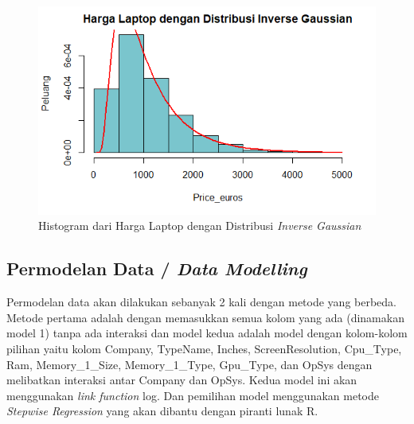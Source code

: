 \documentclass[12pt]{article}
\begin{document}
 \begin{figure}[h!]
    \centering
    \includegraphics[scale = 0.5]{distinv.png}
    \caption{Histogram dari Harga Laptop dengan Distribusi \textit{Inverse Gaussian}}
    \label{fig:ashis}
\end{figure}  

\subsection{Permodelan Data / \textit{Data Modelling}}  
Permodelan data akan dilakukan sebanyak 2 kali dengan metode yang berbeda. Metode pertama adalah dengan memasukkan semua kolom yang ada (dinamakan model 1) tanpa ada interaksi dan model kedua adalah model dengan kolom-kolom pilihan yaitu kolom Company, TypeName, Inches, ScreenResolution, Cpu\_Type, Ram, Memory\_1\_Size, Memory\_1\_Type, Gpu\_Type, dan OpSys dengan melibatkan interaksi antar Company dan OpSys. Kedua model ini akan menggunakan \textit{link function} log. Dan pemilihan model menggunakan metode \textit{Stepwise Regression} yang akan dibantu dengan piranti lunak R.  
\end{document}
